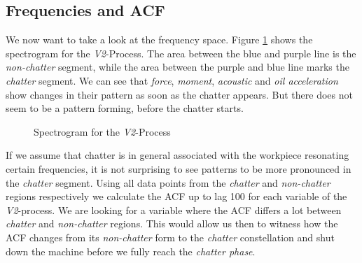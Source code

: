 \documentclass[12 pt]{scrartcl}
\begin{document}
\subsection{Frequencies and ACF}

We now want to take a look at the frequency space. Figure \ref{fig:v2-spec} shows the spectrogram for the \emph{V2}-Process.
The area between the blue and purple line is the \emph{non-chatter} segment, while the area between the purple and blue line marks the \emph{chatter} segment. We can see that \emph{force}, \emph{moment}, \emph{acoustic} and \emph{oil acceleration} show changes in their pattern as soon as the chatter appears. But there does not seem to be a pattern forming, before the chatter starts.

\begin{figure}[p]
  \caption{Spectrogram for the \emph{V2}-Process}
  \label{fig:v2-spec}
\end{figure}

If we assume that chatter is in general associated with the workpiece resonating certain frequencies, it is not surprising to see patterns to be more pronounced in the \emph{chatter} segment. Using all data points from the \emph{chatter} and \emph{non-chatter} regions respectively we calculate the ACF up to lag 100 for each variable of the \emph{V2}-process. We are looking for a variable where the ACF differs a lot between \emph{chatter} and \emph{non-chatter} regions. This would allow us then to witness how the ACF changes from its \emph{non-chatter} form to the \emph{chatter} constellation and shut down the machine before we fully reach the \emph{chatter phase}.
\end{document}
